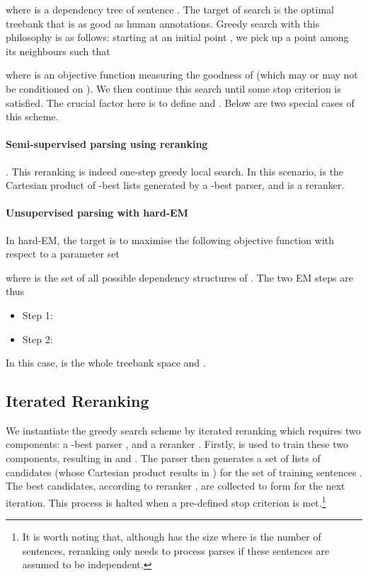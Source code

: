 \documentclass[11pt,letterpaper]{article}
\begin{document}
where  is a dependency tree of sentence .
The target of search is the optimal treebank  that is 
as good as human annotations. Greedy search with this 
philosophy is as follows: starting at an initial point 
, we pick up a point  among its 
neighbours  such that 

where  is an objective function 
measuring the goodness of  (which may or may not be conditioned 
on ). We then continue this search until some stop 
criterion is satisfied. The crucial factor here is to define 
 and . 
Below are two special cases of this scheme.

\paragraph{Semi-supervised parsing using reranking} 
\cite{mcclosky2006effective}. This reranking 
is indeed one-step greedy local search. In this scenario, 
 is the Cartesian product of -best 
lists generated by a -best parser, and 
 is a reranker.

\paragraph{Unsupervised parsing with hard-EM}
\cite{spitkovsky2010viterbiem} 
In hard-EM, the target is to maximise 
the following objective function with respect to a parameter 
set 

where  is the set of all possible dependency structures of . 
The two EM steps are thus
\begin{itemize}
\item Step 1: 

\item Step 2: 

\end{itemize}
In this case,  is the whole treebank space and 
.


\subsection{Iterated Reranking}



We instantiate the greedy search scheme by iterated reranking
which requires two components: a -best parser , and a reranker . 
Firstly,  is used to train these two components, 
resulting in  and . The parser  then generates 
a set of lists of  candidates  (whose Cartesian 
product results in ) for the set of 
training sentences . The best candidates, according 
to reranker , are collected to form  for the 
next iteration. This process is halted when a pre-defined stop 
criterion is met.\footnote{
It is worth noting that, although  
has the size  where  is the number of sentences, reranking 
only needs to process  parses if these sentences 
are assumed to be independent.}
\end{document}
